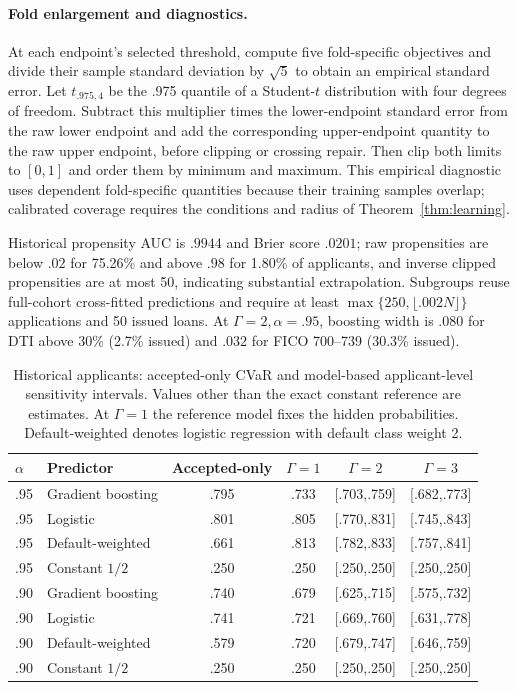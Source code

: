 \paragraph{Fold enlargement and diagnostics.}
At each endpoint's selected threshold, compute five fold-specific objectives and divide
their sample standard deviation by $\sqrt5$ to obtain an empirical standard error. Let
$t_{.975,4}$ be the .975 quantile of a Student-$t$ distribution with four degrees of
freedom. Subtract this multiplier times the lower-endpoint standard error from the raw lower
endpoint and add the corresponding upper-endpoint quantity to the raw upper endpoint, before
clipping or crossing repair. Then clip both limits to $[0,1]$ and order them by minimum and
maximum. This empirical diagnostic uses dependent fold-specific quantities because their
training samples overlap; calibrated coverage requires the conditions and radius of
Theorem~\ref{thm:learning}.

Historical propensity AUC is $.9944$ and Brier score $.0201$; raw propensities
are below $.02$ for 75.26\% and above $.98$ for 1.80\% of applicants, and
inverse clipped propensities are at most 50, indicating substantial extrapolation.
Subgroups reuse full-cohort cross-fitted predictions and require at least
$\max\{250,\lfloor.002N\rfloor\}$ applications and 50 issued loans.
At $\Gamma=2,\alpha=.95$, boosting width is $.080$ for DTI above 30\%
(2.7\% issued) and $.032$ for FICO 700--739 (30.3\% issued).

\begin{table}[!htbp]
\centering\small\setlength{\tabcolsep}{3pt}
\begin{tabular}{llcccc}
\toprule
$\alpha$ & Predictor & Accepted-only & $\Gamma=1$ & $\Gamma=2$ & $\Gamma=3$\\
\midrule
.95 & Gradient boosting & .795 & .733 & [.703,.759] & [.682,.773]\\
.95 & Logistic & .801 & .805 & [.770,.831] & [.745,.843]\\
.95 & Default-weighted & .661 & .813 & [.782,.833] & [.757,.841]\\
.95 & Constant $1/2$ & .250 & .250 & [.250,.250] & [.250,.250]\\
.90 & Gradient boosting & .740 & .679 & [.625,.715] & [.575,.732]\\
.90 & Logistic & .741 & .721 & [.669,.760] & [.631,.778]\\
.90 & Default-weighted & .579 & .720 & [.679,.747] & [.646,.759]\\
.90 & Constant $1/2$ & .250 & .250 & [.250,.250] & [.250,.250]\\
\bottomrule
\end{tabular}
\caption{Historical applicants: accepted-only CVaR and model-based applicant-level
sensitivity intervals. Values other than the exact constant reference are estimates.
At $\Gamma=1$ the reference model fixes the hidden probabilities. Default-weighted denotes logistic
regression with default class weight 2.}
\label{tab:lc-parta}
\end{table}

